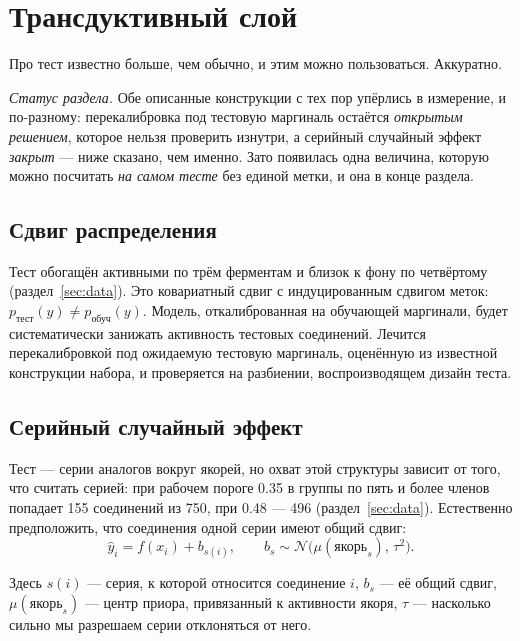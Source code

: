 \section{Трансдуктивный слой}
\label{sec:trans}

Про тест известно больше, чем обычно, и этим можно пользоваться. Аккуратно.

\emph{Статус раздела.} Обе описанные конструкции с тех пор упёрлись в измерение, и по-разному:
перекалибровка под тестовую маргиналь остаётся \emph{открытым решением}, которое нельзя проверить
изнутри, а серийный случайный эффект \emph{закрыт} --- ниже сказано, чем именно. Зато появилась одна
величина, которую можно посчитать \emph{на самом тесте} без единой метки, и она в конце раздела.

\subsection{Сдвиг распределения}

Тест обогащён активными по трём ферментам и близок к фону по четвёртому (раздел~\ref{sec:data}). Это ковариатный сдвиг
с индуцированным сдвигом меток: $p_{\text{тест}}(y) \ne p_{\text{обуч}}(y)$. Модель, откалиброванная
на обучающей маргинали, будет систематически занижать активность тестовых соединений. Лечится
перекалибровкой под ожидаемую тестовую маргиналь, оценённую из известной конструкции набора, и проверяется
на разбиении, воспроизводящем дизайн теста.

\subsection{Серийный случайный эффект}

Тест --- серии аналогов вокруг якорей, но охват этой структуры зависит от того, что считать серией:
при рабочем пороге 0.35 в группы по пять и более членов попадает 155 соединений из 750, при 0.48 ---
496 (раздел~\ref{sec:data}). Естественно предположить, что соединения одной серии имеют общий сдвиг:
\begin{equation}
\hat y_i = f(x_i) + b_{s(i)},
\qquad b_s \sim \mathcal{N}\bigl(\mu(\text{якорь}_s),\, \tau^2\bigr) .
\label{eq:series}
\end{equation}

Здесь $s(i)$ --- серия, к которой относится соединение $i$, $b_s$ --- её общий сдвиг, $\mu(\text{якорь}_s)$ ---
центр приора, привязанный к активности якоря, $\tau$ --- насколько сильно мы разрешаем серии отклоняться
от него.

